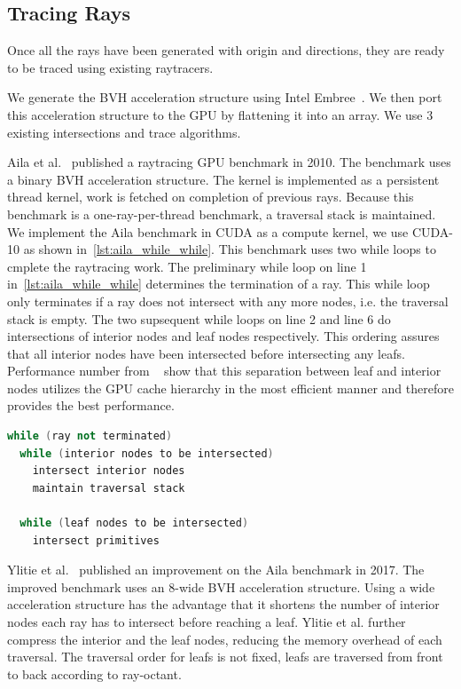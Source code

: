 \subsection{Tracing Rays}

Once all the rays have been generated with origin and directions, they are ready to be traced using existing raytracers. 

We generate the BVH acceleration structure using Intel Embree~\cite{Wald:2014:EKF:2601097.2601199}. We then port this acceleration structure to the GPU by flattening it into an array. 
We use 3 existing intersections and trace algorithms.

Aila et al.~\cite{Aila:2009:UER:1572769.1572792} published a raytracing GPU benchmark in 2010. The benchmark uses a binary BVH acceleration structure.
The kernel is implemented as a persistent thread kernel, work is fetched on completion of previous rays. Because this benchmark is a one-ray-per-thread benchmark, a traversal stack is maintained. 
We implement the Aila benchmark in CUDA as a compute kernel, we use CUDA-10 as shown in~\autoref{lst:aila_while_while}. This benchmark uses two while loops to cmplete the raytracing work. 
The preliminary while loop on line 1 in~\autoref{lst:aila_while_while} determines the termination of a ray. This while loop only terminates if a ray does not intersect with any more nodes, i.e. the traversal stack is empty. 
The two supsequent while loops on line 2 and line 6 do intersections of interior nodes and leaf nodes respectively. This ordering assures that all interior nodes have been intersected before intersecting any leafs. Performance number from ~\cite{Aila:2009:UER:1572769.1572792} show that this separation between leaf and interior nodes utilizes the GPU cache hierarchy in the most efficient manner and therefore provides the best performance. 

\begin{lstlisting}[caption={While-While loop for Aila et al.~\cite{Aila:2009:UER:1572769.1572792} raytracing benchmark},label={lst:aila_while_while}, language=C++]
while (ray not terminated)
  while (interior nodes to be intersected)
    intersect interior nodes
    maintain traversal stack

  while (leaf nodes to be intersected)
    intersect primitives
\end{lstlisting}


Ylitie et al.~\cite{Aila:2009:UER:1572769.1572792} published an improvement on the Aila benchmark in 2017.
The improved benchmark uses an 8-wide BVH acceleration structure. Using a wide acceleration structure has the advantage that it shortens the number of interior nodes each ray has to intersect before reaching a leaf. Ylitie et al. further compress the interior and the leaf nodes, reducing the memory overhead of each traversal. The traversal order for leafs is not fixed, leafs are traversed from front to back according to ray-octant.

